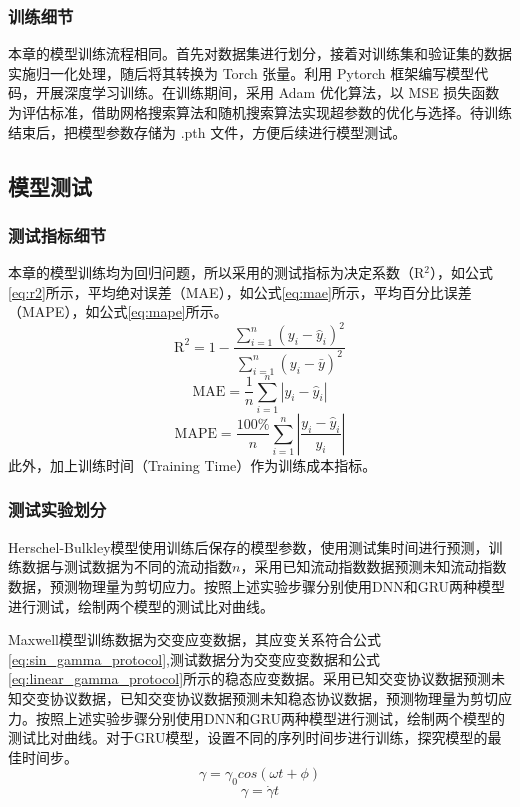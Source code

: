 \subsubsection{训练细节}
本章的模型训练流程相同。首先对数据集进行划分，接着对训练集和验证集的数据实施归一化处理，随后将其转换为 Torch 张量。利用 Pytorch 框架编写模型代码，开展深度学习训练。在训练期间，采用 Adam 优化算法，以 MSE 损失函数为评估标准，借助网格搜索算法和随机搜索算法实现超参数的优化与选择。待训练结束后，把模型参数存储为 .pth 文件，方便后续进行模型测试。

\subsection{模型测试}
\subsubsection{测试指标细节}
本章的模型训练均为回归问题，所以采用的测试指标为决定系数（R$^2$），如公式\eqref{eq:r2}所示，平均绝对误差（MAE），如公式\eqref{eq:mae}所示，平均百分比误差（MAPE），如公式\eqref{eq:mape}所示。
\begin{equation}
  \text{R}^2 = 1 - \frac{\sum_{i=1}^{n} (y_i - \hat{y}_i)^2}{\sum_{i=1}^{n} (y_i - \bar{y})^2} \label{eq:r2}
\end{equation}
\begin{equation}
  \text{MAE} = \frac{1}{n} \sum_{i=1}^{n} |y_i - \hat{y}_i| \label{eq:mae}
\end{equation}
\begin{equation}
  \text{MAPE} = \frac{100\%}{n} \sum_{i=1}^{n} \left| \frac{y_i - \hat{y}_i}{y_i} \right| \label{eq:mape}
\end{equation}
此外，加上训练时间（Training Time）作为训练成本指标。

\subsubsection{测试实验划分}
Herschel-Bulkley模型使用训练后保存的模型参数，使用测试集时间进行预测，训练数据与测试数据为不同的流动指数$n$，采用已知流动指数数据预测未知流动指数数据，预测物理量为剪切应力。按照上述实验步骤分别使用DNN和GRU两种模型进行测试，绘制两个模型的测试比对曲线。

Maxwell模型训练数据为交变应变数据，其应变关系符合公式\eqref{eq:sin_gamma_protocol},测试数据分为交变应变数据和公式\eqref{eq:linear_gamma_protocol}所示的稳态应变数据。采用已知交变协议数据预测未知交变协议数据，已知交变协议数据预测未知稳态协议数据，预测物理量为剪切应力。按照上述实验步骤分别使用DNN和GRU两种模型进行测试，绘制两个模型的测试比对曲线。对于GRU模型，设置不同的序列时间步进行训练，探究模型的最佳时间步。
\begin{equation}
  \gamma=\gamma_0cos(\omega t+\phi) \label{eq:sin_gamma_protocol}
\end{equation}
\begin{equation}
  \gamma=\dot{\gamma}t \label{eq:linear_gamma_protocol}
\end{equation}

